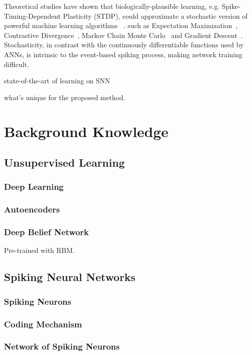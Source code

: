\documentclass[conference]{IEEEtran}
\begin{document}
	Theoretical studies have shown that biologically-plausible learning, e.g. Spike-Timing-Dependent Plasticity (STDP), could approximate a stochastic version of powerful machine learning algorithms	~\cite{nessler2013bayesian,neftci2013event,neftci2013event,o2016deep}.
	such as Expectation Maximization~\cite{nessler2013bayesian}, 
	Contrastive Divergence~\cite{neftci2013event}, Markov Chain Monte Carlo~\cite{buesing2011neural} and Gradient Descent~\cite{o2016deep}.
	Stochasticity, in contrast with the continuously differentiable functions used by ANNs, is intrinsic to the event-based spiking process, making network training difficult.
	
	state-of-the-art of learning on SNN\cite{ponulak2010supervised,neftci2013event,burbank2015mirrored}
	
	what's unique for the proposed method.
	
\section{Background Knowledge}
\subsection{Unsupervised Learning}
\subsubsection{Deep Learning}
\subsubsection{Autoencoders}
\subsubsection{Deep Belief Network}
Pre-trained with RBM.
\subsection{Spiking Neural Networks}
\subsubsection{Spiking Neurons}
\subsubsection{Coding Mechanism}
\subsubsection{Network of Spiking Neurons}
\end{document}
